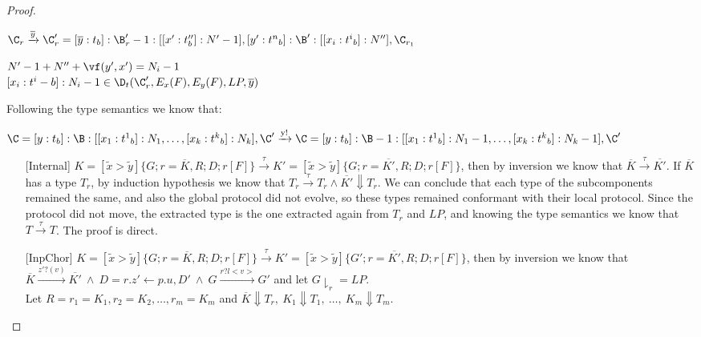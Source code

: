 \begin{proof}
\begin{itemize}
\begin{itemize}
$\C_r\xrightarrow{\text{$\overline{y}$}}\C_r'=[\overline{y}:t_b]:\B_r'-1:[[x':t_b'']:N'-1],[y':{t^n}_b]:\B':[[x_i:{t^i}_b]:N''],\C_{r_1}$

$N'-1+N''+\vf(y',x')=N_i-1$\\

$[x_i:{t^i}-b]:N_i-1 \in \D_t(\C_r',E_x(F),E_y(F),LP,\overline{y})$ 

\end{itemize}



Following the type semantics we know that:

$\C=[y:t_b]:\B:[[x_1:{t^1}_b]:N_1, \dots, [x_k:{t^k}_b]:N_k],\C'\xrightarrow{\text{y!}}\C=[y:t_b]:\B-1:[[x_1:{t^1}_b]:N_1-1, \dots, [x_k:{t^k}_b]:N_k-1],\C'$

\end{itemize}




\begin{itemize}


\item [{[Internal]}]
$K=[\tilde{x}>\tilde{y}]\{G;r=\overline{K},R;D;r[F]\}\xrightarrow{\text{$\tau$}} K'=[\tilde{x}>\tilde{y}]\{G;r=\overline{K'},R;D;r[F]\}$, then by inversion we know that  $\overline{K}\xrightarrow{\text{$\tau$}}\overline{K'}$. If $\overline{K}$ has a type $T_r$, by induction hypothesis we know that $T_r\xrightarrow{\text{$\tau$}}T_r \wedge \overline{K'}\Downarrow T_r$. We can conclude that each type of the subcomponents remained the same, and also the global protocol did not evolve, so these types remained conformant with their local protocol.   Since the protocol did not move, the extracted type is the one extracted again from $T_r$ and $LP$, and knowing the type semantics we know that $T\xrightarrow{\text{$\tau$}}T$. The proof is direct.\\




\item [{[InpChor]}]
$K=[\tilde{x}>\tilde{y}]\{G;r=\overline{K},R;D;r[F]\}\xrightarrow{\text{$\tau$}} K'=[\tilde{x}>\tilde{y}]\{G';r=\overline{K'},R;D;r[F]\}$, then by inversion we know that $ \overline{K}\xrightarrow{\text{$z'?(v)$}}\overline{K'}\  \wedge \  D=r.z'\leftarrow p.u,D' \ \wedge \ G\xrightarrow{\text{$r?l<v>$}}G'$ and let $G\downharpoonright_r=LP$.\\ 
Let $R=r_1=K_1,r_2=K_2,\dots, r_m=K_m$ and
$\overline{K}\Downarrow T_r,\ K_1\Downarrow T_1,\ \dots,\  K_m\Downarrow T_m$.


\end{itemize}
\end{proof}
